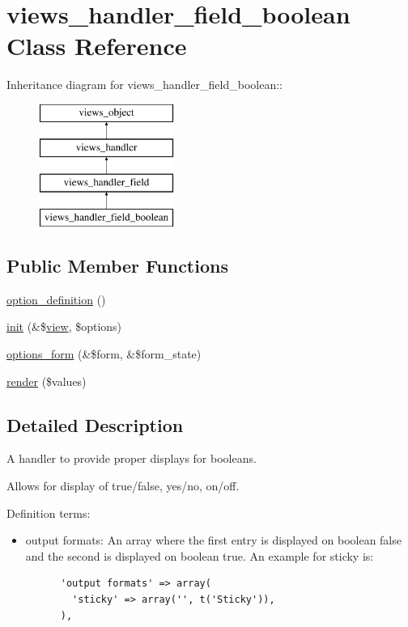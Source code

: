 \hypertarget{classviews__handler__field__boolean}{
\section{views\_\-handler\_\-field\_\-boolean Class Reference}
\label{classviews__handler__field__boolean}
}
Inheritance diagram for views\_\-handler\_\-field\_\-boolean::\begin{figure}[H]
\begin{center}
\leavevmode
\includegraphics[height=4cm]{classviews__handler__field__boolean}
\end{center}
\end{figure}
\subsection*{Public Member Functions}
\begin{CompactItemize}
\item 
\hyperlink{classviews__handler__field__boolean_53f8c9215cddcfb3cab33f742a1e6c52}{option\_\-definition} ()
\item 
\hyperlink{classviews__handler__field__boolean_0150fb8a25c2f1f2537d476b1c448238}{init} (\&\$\hyperlink{classview}{view}, \$options)
\item 
\hyperlink{classviews__handler__field__boolean_3addce6b85348a630627f348907082e3}{options\_\-form} (\&\$form, \&\$form\_\-state)
\item 
\hyperlink{classviews__handler__field__boolean_d7d7fc1b29362cee6b2f043e029052af}{render} (\$values)
\end{CompactItemize}


\subsection{Detailed Description}
A handler to provide proper displays for booleans.

Allows for display of true/false, yes/no, on/off.

Definition terms:\begin{itemize}
\item output formats: An array where the first entry is displayed on boolean false and the second is displayed on boolean true. An example for sticky is: 

\begin{Code}\begin{verbatim}      'output formats' => array(
        'sticky' => array('', t('Sticky')),
      ),
\end{verbatim}
\end{Code}

 \end{itemize}


